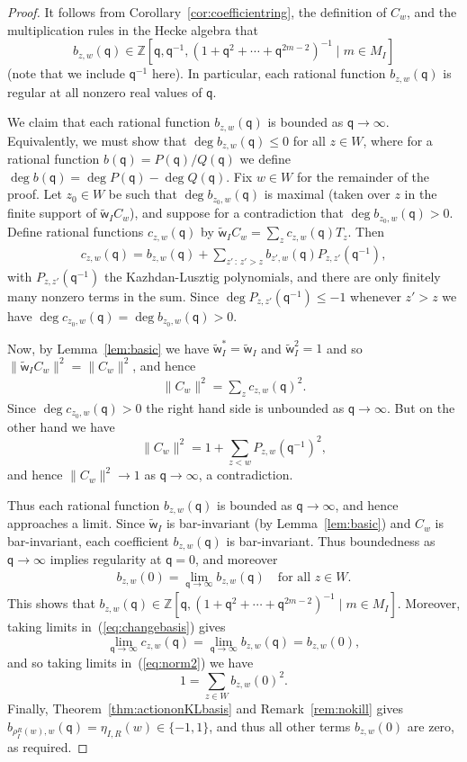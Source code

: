\documentclass[11pt]{article}
\theoremstyle{plain}
\theoremstyle{definition}
\numberwithin{equation}{section}
\def\tw{\widetilde{\mathsf{w}}_I}
\def\ZZ{\mathbb{Z}}
\newcommand{\sq}{\mathsf{q}}
\begin{document}
\begin{proof}
It follows from Corollary~\ref{cor:coefficientring}, the definition of $C_w$, and the multiplication rules in the Hecke algebra that 
$$
b_{z,w}(\sq)\in\ZZ[\sq,\sq^{-1},(1+\sq^2+\cdots+\sq^{2m-2})^{-1}\mid m\in M_I]
$$
(note that we include $\sq^{-1}$ here). In particular, each rational function $b_{z,w}(\sq)$ is regular at all nonzero real values of $\sq$. 


We claim that each rational function $b_{z,w}(\sq)$ is bounded as $\sq\to\infty$. Equivalently, we must show that $\deg b_{z,w}(\sq)\leq 0$ for all $z\in W$, where for a rational function $b(\sq)=P(\sq)/Q(\sq)$ we define $\deg b(\sq)=\deg P(\sq)-\deg Q(\sq)$. Fix $w\in W$ for the remainder of the proof. Let $z_0\in W$ be such that $\deg b_{z_0,w}(\sq)$ is maximal (taken over $z$ in the finite support of $\tw C_w$), and suppose for a contradiction that $\deg b_{z_0,w}(\sq)>0$. Define rational functions $c_{z,w}(\sq)$ by $\tw C_w=\sum_{z}c_{z,w}(\sq)T_z$. Then 
\begin{align}\label{eq:changebasis}
c_{z,w}(\sq)=b_{z,w}(\sq)+\sum_{z'\,:\,z'>z}b_{z',w}(\sq)P_{z,z'}(\sq^{-1}),
\end{align}
with $P_{z,z'}(\sq^{-1})$ the Kazhdan-Lusztig polynomials, and there are only finitely many nonzero terms in the sum. Since $\deg P_{z,z'}(\sq^{-1})\leq -1$ whenever $z'>z$ we have $\deg c_{z_0,w}(\sq)=\deg b_{z_0,w}(\sq)>0$. 

Now, by Lemma~\ref{lem:basic} we have $\tw^*=\tw$ and $\tw^2=1$ and so $\|\tw C_w\|^2=\|C_w\|^2$, and hence
\begin{align}\label{eq:norm2}
\|C_w\|^2=\sum_zc_{z,w}(\sq)^2. 
\end{align}
Since $\deg c_{z_0,w}(\sq)>0$ the right hand side is unbounded as $\sq\to\infty$. But on the other hand we have
$$
\|C_w\|^2=1+\sum_{z<w}P_{z,w}(\sq^{-1})^2,
$$
and hence $\|C_w\|^2\to 1$ as $\sq\to\infty$, a contradiction. 

Thus each rational function $b_{z,w}(\sq)$ is bounded as $\sq\to\infty$, and hence approaches a limit. Since $\tw$ is bar-invariant (by Lemma~\ref{lem:basic}) and $C_w$ is bar-invariant, each coefficient $b_{z,w}(\sq)$ is bar-invariant. Thus boundedness as $\sq\to\infty$ implies regularity at $\sq=0$, and moreover
\begin{align}\label{eq:limit1}
b_{z,w}(0)=\lim_{\sq\to\infty}b_{z,w}(\sq)\quad\text{for all $z\in W$}.
\end{align}
This shows that $
b_{z,w}(\sq)\in\ZZ[\sq,(1+\sq^2+\cdots+\sq^{2m-2})^{-1}\mid m\in M_I]
$. Moreover, taking limits in~(\ref{eq:changebasis}) gives 
$$
\lim_{\sq\to\infty}c_{z,w}(\sq)=\lim_{\sq\to\infty}b_{z,w}(\sq)=b_{z,w}(0),
$$
and so taking limits in~(\ref{eq:norm2}) we have
$$
1=\sum_{z\in W}b_{z,w}(0)^2. 
$$
Finally, Theorem~\ref{thm:actiononKLbasis} and Remark~\ref{rem:nokill} gives $b_{\rho_I^R(w),w}(\sq)=\eta_{I,R}(w)\in\{-1,1\}$, and thus all other terms $b_{z,w}(0)$ are zero, as required. 
\end{proof}
\end{document}
